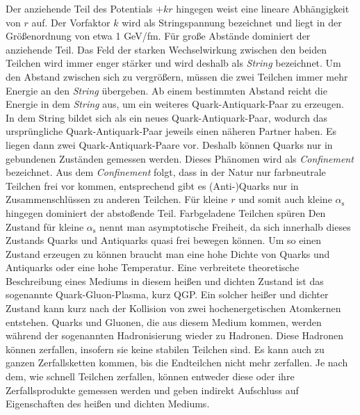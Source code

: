 \newline
Der anziehende Teil des Potentials $+kr$ hingegen weist eine lineare Abh\"angigkeit von $r$ auf.
Der Vorfaktor $k$ wird als Stringspannung bezeichnet und liegt in der Gr\"o{\ss}enordnung von etwa 1 GeV/fm.
F\"ur gro{\ss}e Abst\"ande dominiert der anziehende Teil.
Das Feld der starken Wechselwirkung zwischen den beiden Teilchen wird immer enger st\"arker und wird deshalb als \textit{String} bezeichnet.
Um den Abstand zwischen sich zu vergr\"o{\ss}ern, m\"ussen die zwei Teilchen immer mehr Energie an den \textit{String} \"ubergeben.
Ab einem bestimmten Abstand reicht die Energie in dem \textit{String} aus, um ein weiteres Quark-Antiquark-Paar zu erzeugen.
In dem String bildet sich als ein neues Quark-Antiquark-Paar, wodurch das urspr\"ungliche Quark-Antiquark-Paar jeweils einen n\"aheren Partner haben.
Es liegen dann zwei Quark-Antiquark-Paare vor.
Deshalb k\"onnen Quarks nur in gebundenen Zust\"anden gemessen werden.
Dieses Ph\"anomen wird als \textit{Confinement} bezeichnet.
Aus dem \textit{Confinement} folgt, dass in der Natur nur farbneutrale Teilchen frei vor kommen, entsprechend gibt es (Anti-)Quarks nur in Zusammenschl\"ussen zu anderen Teilchen.%
\newline
F\"ur kleine $r$ und somit auch kleine $\alpha_\text{s}$ hingegen dominiert der absto{\ss}ende Teil.
Farbgeladene Teilchen sp\"uren 
Den Zustand f\"ur kleine $\alpha_\text{s}$ nennt man asymptotische Freiheit, da sich innerhalb dieses Zustands Quarks und Antiquarks quasi frei bewegen k\"onnen.
Um so einen Zustand erzeugen zu k\"onnen braucht man eine hohe Dichte von Quarks und Antiquarks oder eine hohe Temperatur.
Eine verbreitete theoretische Beschreibung eines Mediums in diesem hei{\ss}en und dichten Zustand ist das sogenannte Quark-Gluon-Plasma, kurz QGP.
\newline
Ein solcher hei{\ss}er und dichter Zustand kann kurz nach der Kollision von zwei hochenergetischen Atomkernen entstehen.
Quarks und Gluonen, die aus diesem Medium kommen, werden w\"ahrend der sogenannten Hadronisierung wieder zu Hadronen.
Diese Hadronen k\"onnen zerfallen, insofern sie keine stabilen Teilchen sind.
Es kann auch zu ganzen Zerfallsketten kommen, bis die Endteilchen nicht mehr zerfallen.
Je nach dem, wie schnell Teilchen zerfallen, k\"onnen entweder diese oder ihre Zerfallsprodukte gemessen werden und geben indirekt Aufschluss auf Eigenschaften des hei{\ss}en und dichten Mediums.
